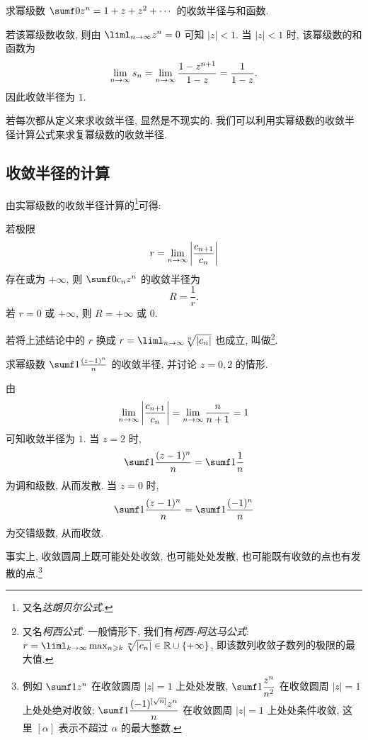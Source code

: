 \begin{example}
  求幂级数 $\sumf0 z^n=1+z+z^2+\cdots$ 的收敛半径与和函数.
\end{example}

\begin{solution}
  若该幂级数收敛, 则由 $\liml_{n\ra\infty}z^n=0$ 可知 $|z|<1$.
  当 $|z|<1$ 时, 该幂级数的和函数为
  \[
     \lim_{n\rightarrow\infty}s_n
    =\lim_{n\rightarrow\infty}\frac{1-z^{n+1}}{1-z}
    =\frac1{1-z}.
  \]
  因此收敛半径为 $1$.
\end{solution}

若每次都从定义来求收敛半径, 显然是不现实的.
我们可以利用实幂级数的收敛半径计算公式来求复幂级数的收敛半径.


\subsection{收敛半径的计算}

由实幂级数的收敛半径计算的\footnote{又名\emph{达朗贝尔公式}.}可得:
\begin{theorem}
  若极限
  \[
    r=\lim_{n\rightarrow\infty}\left|\frac{c_{n+1}}{c_n}\right|
  \]
  存在或为 $+\infty$, 则 $\sumf0 c_nz^n$ 的收敛半径为
  \[
    R=\dfrac1r.
  \]
  若 $r=0$ 或 $+\infty$, 则 $R=+\infty$ 或 $0$.
\end{theorem}

若将上述结论中的 $r$ 换成 $r=\liml_{n\ra\infty}\sqrt[n]{\abs{c_n}}$ 也成立, 叫做\footnote{
  又名\emph{柯西公式}.
  一般情形下, 我们有\emph{柯西-阿达马公式}: 
  $r=\liml_{k\ra\infty}\max_{n\ge k}\sqrt[n]{\abs{c_n}}\in\BR\cup\{+\infty\}$, 即该数列收敛子数列的极限的最大值.
}.

\begin{example}
  求幂级数 $\sumf1 \frac{(z-1)^n}n$ 的收敛半径, 并讨论 $z=0,2$ 的情形.
\end{example}

\begin{solution}
  由
  \[
     \lim_{n\rightarrow\infty}\left|\frac{c_{n+1}}{c_n}\right|
    =\lim_{n\rightarrow\infty}\frac n{n+1}=1
  \]
  可知收敛半径为 $1$.
  当 $z=2$ 时,
  \[
    \sumf1 \frac{(z-1)^n}n=\sumf1 \frac1n
  \]
  为调和级数, 从而发散.
  当 $z=0$ 时,
  \[
    \sumf1 \frac{(z-1)^n}n=\sumf1 \frac{(-1)^n}n
  \]
  为交错级数, 从而收敛.
\end{solution}

事实上, \alert{收敛圆周上既可能处处收敛, 也可能处处发散, 也可能既有收敛的点也有发散的点}.\footnote{
  例如 $\sumf1 z^n$ 在收敛圆周 $|z|=1$ 上处处发散, $\sumf1 \dfrac{z^n}{n^2}$ 在收敛圆周 $|z|=1$ 上处处绝对收敛; $\sumf1 \dfrac{(-1)^{[\sqrt n]}z^n}{n}$ 在收敛圆周 $|z|=1$ 上处处条件收敛, 这里 $[\alpha]$ 表示不超过 $\alpha$ 的最大整数.
}

